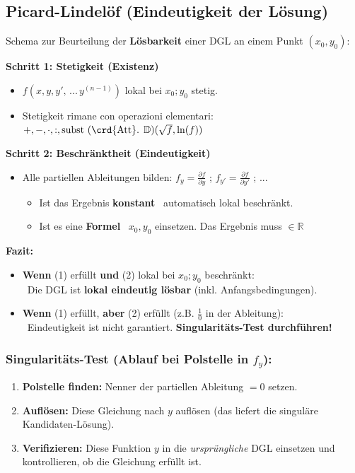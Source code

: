 \subsection{Picard-Lindelöf (Eindeutigkeit der Lösung)}

Schema zur Beurteilung der \textbf{Lösbarkeit} einer DGL an einem Punkt $(x_0, y_0)$:

\medskip
\textbf{Schritt 1: Stetigkeit (Existenz)}
\begin{itemize}
    \item[(1)] $f(x, y, y', \, ... \, y^{(n-1)} )$ lokal bei $x_0 ; y_0$ stetig.
    \item[] Stetigkeit rimane con operazioni elementari: $+, -, \cdot, :, \text{subst (\crd{Att}. }\mathbb{D}) (\sqrt{f}, \ln(f))$\\
\end{itemize}

\textbf{Schritt 2: Beschränktheit (Eindeutigkeit)}
\begin{itemize}
    \item[(2)] Alle partiellen Ableitungen bilden: $f_y = \frac{\partial f}{\partial y}$ ; $f_{y'} = \frac{\partial f}{\partial y'}$ ; ...
    \begin{itemize}
        \item Ist das Ergebnis \textbf{konstant} \textrightarrow\ automatisch lokal beschränkt.
        \item Ist es eine \textbf{Formel} \textrightarrow\ $x_0, y_0$ einsetzen. 
        Das Ergebnis muss $\in \mathbb{R}$
    \end{itemize}
\end{itemize}

\medskip
\textbf{Fazit:}
\begin{itemize}
    \item \textbf{Wenn} (1) erfüllt \textbf{und} (2) lokal bei $x_0 ; y_0$ beschränkt: \\
    \textrightarrow\ Die DGL ist \textbf{lokal eindeutig lösbar} (inkl. Anfangsbedingungen).
    \item \textbf{Wenn} (1) erfüllt, \textbf{aber} (2)  erfüllt (z.B. $\frac{1}{0}$ in der Ableitung): \\
    \textrightarrow\ Eindeutigkeit ist nicht garantiert. \textbf{Singularitäts-Test durchführen!}
\end{itemize}

\medskip
\subsubsection{Singularitäts-Test (Ablauf bei Polstelle in $f_y$):}
\begin{enumerate}
    \item \textbf{Polstelle finden:} Nenner der partiellen Ableitung $= 0$ setzen.
    \item \textbf{Auflösen:} Diese Gleichung nach $y$ auflösen (das liefert die singuläre Kandidaten-Lösung).
    \item \textbf{Verifizieren:} Diese Funktion $y$ in die \textit{ursprüngliche} DGL einsetzen und kontrollieren, ob die Gleichung erfüllt ist.
\end{enumerate}

